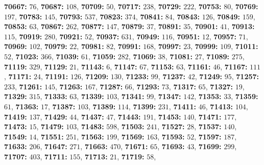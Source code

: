 \textsf{\bfseries 70667:} $76$, \textsf{\bfseries 70687:} $108$, \textsf{\bfseries 70709:} $50$, \textsf{\bfseries 70717:} $238$, \textsf{\bfseries 70729:} $222$, \textsf{\bfseries 70753:} $80$, \textsf{\bfseries 70769:} $197$, \textsf{\bfseries 70783:} $145$, \textsf{\bfseries 70793:} $537$, \textsf{\bfseries 70823:} $374$, \textsf{\bfseries 70841:} $84$, \textsf{\bfseries 70843:} $126$, \textsf{\bfseries 70849:} $159$, \textsf{\bfseries 70853:} $63$, \textsf{\bfseries 70867:} $262$, \textsf{\bfseries 70877:} $147$, \textsf{\bfseries 70879:} $37$, \textsf{\bfseries 70891:} $35$, \textsf{\bfseries 70901:} $41$, \textsf{\bfseries 70913:} $115$, \textsf{\bfseries 70919:} $280$, \textsf{\bfseries 70921:} $52$, \textsf{\bfseries 70937:} $631$, \textsf{\bfseries 70949:} $116$, \textsf{\bfseries 70951:} $12$, \textsf{\bfseries 70957:} $71$, \textsf{\bfseries 70969:} $102$, \textsf{\bfseries 70979:} $22$, \textsf{\bfseries 70981:} $82$, \textsf{\bfseries 70991:} $168$, \textsf{\bfseries 70997:} $23$, \textsf{\bfseries 70999:} $109$, \textsf{\bfseries 71011:} $52$, \textsf{\bfseries 71023:} $366$, \textsf{\bfseries 71039:} $61$, \textsf{\bfseries 71059:} $282$, \textsf{\bfseries 71069:} $38$, \textsf{\bfseries 71081:} $27$, \textsf{\bfseries 71089:} $275$, \textsf{\bfseries 71119:} $329$, \textsf{\bfseries 71129:} $21$, \textsf{\bfseries 71143:} $6$, \textsf{\bfseries 71147:} $67$, \textsf{\bfseries 71153:} $63$, \textsf{\bfseries 71161:} $46$, \textsf{\bfseries 71167:} $111$, \textsf{\bfseries 71171:} $24$, \textsf{\bfseries 71191:} $126$, \textsf{\bfseries 71209:} $130$, \textsf{\bfseries 71233:} $99$, \textsf{\bfseries 71237:} $42$, \textsf{\bfseries 71249:} $95$, \textsf{\bfseries 71257:} $233$, \textsf{\bfseries 71261:} $145$, \textsf{\bfseries 71263:} $167$, \textsf{\bfseries 71287:} $66$, \textsf{\bfseries 71293:} $73$, \textsf{\bfseries 71317:} $65$, \textsf{\bfseries 71327:} $19$, \textsf{\bfseries 71329:} $315$, \textsf{\bfseries 71333:} $63$, \textsf{\bfseries 71339:} $103$, \textsf{\bfseries 71341:} $99$, \textsf{\bfseries 71347:} $142$, \textsf{\bfseries 71353:} $33$, \textsf{\bfseries 71359:} $61$, \textsf{\bfseries 71363:} $17$, \textsf{\bfseries 71387:} $103$, \textsf{\bfseries 71389:} $114$, \textsf{\bfseries 71399:} $231$, \textsf{\bfseries 71411:} $46$, \textsf{\bfseries 71413:} $104$, \textsf{\bfseries 71419:} $137$, \textsf{\bfseries 71429:} $44$, \textsf{\bfseries 71437:} $47$, \textsf{\bfseries 71443:} $191$, \textsf{\bfseries 71453:} $140$, \textsf{\bfseries 71471:} $177$, \textsf{\bfseries 71473:} $15$, \textsf{\bfseries 71479:} $103$, \textsf{\bfseries 71483:} $598$, \textsf{\bfseries 71503:} $241$, \textsf{\bfseries 71527:} $28$, \textsf{\bfseries 71537:} $140$, \textsf{\bfseries 71549:} $14$, \textsf{\bfseries 71551:} $251$, \textsf{\bfseries 71563:} $199$, \textsf{\bfseries 71569:} $163$, \textsf{\bfseries 71593:} $52$, \textsf{\bfseries 71597:} $187$, \textsf{\bfseries 71633:} $206$, \textsf{\bfseries 71647:} $271$, \textsf{\bfseries 71663:} $470$, \textsf{\bfseries 71671:} $65$, \textsf{\bfseries 71693:} $43$, \textsf{\bfseries 71699:} $299$, \textsf{\bfseries 71707:} $403$, \textsf{\bfseries 71711:} $155$, \textsf{\bfseries 71713:} $21$, \textsf{\bfseries 71719:} $58$, 
